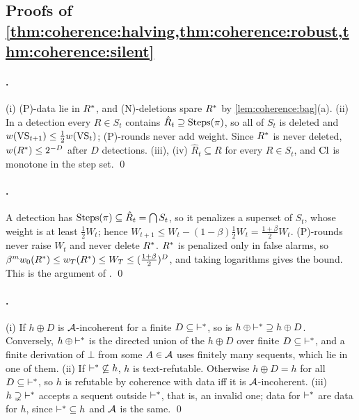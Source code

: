 \subsection{Proofs of \texorpdfstring{\cref{thm:coherence:halving,thm:coherence:robust,thm:coherence:silent}}{the halving, robustness and silence theorems}}\label{app:coherence:halving}

\paragraph{.} (i) (P)-data lie in $R^{*}$, and (N)-deletions spare $R^{*}$ by \cref{lem:coherence:bag}(a). (ii) In a detection every $R\in S_t$ contains $\hat R_t\supseteq\mathrm{Steps}(\pi)$, so all of $S_t$ is deleted and $w(\mathrm{VS}_{t+1})\le\frac12w(\mathrm{VS}_t)$; (P)-rounds never add weight. Since $R^{*}$ is never deleted, $w(R^{*})\le2^{-D}$ after $D$ detections. (iii), (iv) $\hat R_t\subseteq R$ for every $R\in S_t$, and $\mathrm{Cl}$ is monotone in the step set. \qed

\paragraph{.} A detection has $\mathrm{Steps}(\pi)\subseteq\hat R_t=\bigcap S_t$, so it penalizes a superset of $S_t$, whose weight is at least $\frac12W_t$; hence $W_{t+1}\le W_t-(1-\beta)\frac12W_t=\frac{1+\beta}2W_t$. (P)-rounds never raise $W_t$ and never delete $R^{*}$. $R^{*}$ is penalized only in false alarms, so $\beta^mw_0(R^{*})\le w_T(R^{*})\le W_T\le(\frac{1+\beta}2)^D$, and taking logarithms gives the bound. This is the argument of \citet{littlestone1994weighted}. \qed

\paragraph{.} (i) If $h\oplus D$ is $\mathcal{A}$-incoherent for a finite $D\subseteq{\vdash^{*}}$, so is $h\oplus{\vdash^{*}}\supseteq h\oplus D$. Conversely, $h\oplus{\vdash^{*}}$ is the directed union of the $h\oplus D$ over finite $D\subseteq{\vdash^{*}}$, and a finite derivation of $\bot$ from some $A\in\mathcal{A}$ uses finitely many sequents, which lie in one of them. (ii) If ${\vdash^{*}}\not\subseteq h$, $h$ is text-refutable. Otherwise $h\oplus D=h$ for all $D\subseteq{\vdash^{*}}$, so $h$ is refutable by coherence with data iff it is $\mathcal{A}$-incoherent. (iii) $h\supsetneq{\vdash^{*}}$ accepts a sequent outside $\vdash^{*}$, that is, an invalid one; data for $\vdash^{*}$ are data for $h$, since ${\vdash^{*}}\subseteq h$ and $\mathcal{A}$ is the same. \qed

